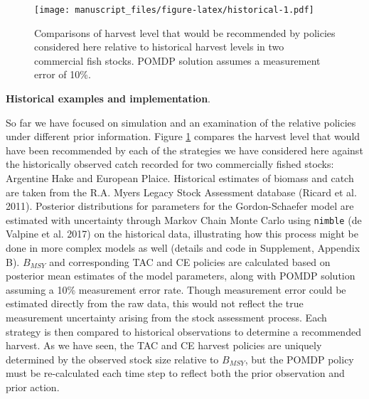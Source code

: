 \documentclass[3p]{elsarticle} %
\makeatletter
\def\maxwidth{\ifdim\Gin@nat@width>\linewidth\linewidth
\else\Gin@nat@width\fi}
\let\Oldincludegraphics\includegraphics
\renewcommand{\includegraphics}[1]{\Oldincludegraphics[width=\maxwidth]{#1}}
\makeatother
\begin{document}
\begin{figure}
\centering
\texttt{[image: manuscript\_files/figure-latex/historical-1.pdf]}
\caption{Comparisons of harvest level that would be recommended by
policies considered here relative to historical harvest levels in two
commercial fish stocks. POMDP solution assumes a measurement error of
10\%. \label{historical}}
\end{figure}

\textbf{Historical examples and implementation}.

So far we have focused on simulation and an examination of the relative
policies under different prior information. Figure \ref{historical}
compares the harvest level that would have been recommended by each of
the strategies we have considered here against the historically observed
catch recorded for two commercially fished stocks: Argentine Hake and
European Plaice. Historical estimates of biomass and catch are taken
from the R.A. Myers Legacy Stock Assessment database (Ricard et al.
2011). Posterior distributions for parameters for the Gordon-Schaefer
model are estimated with uncertainty through Markov Chain Monte Carlo
using \texttt{nimble} (de Valpine et al. 2017) on the historical data,
illustrating how this process might be done in more complex models as
well (details and code in Supplement, Appendix B). \(B_{MSY}\) and
corresponding TAC and CE policies are calculated based on posterior mean
estimates of the model parameters, along with POMDP solution assuming a
10\% measurement error rate. Though measurement error could be estimated
directly from the raw data, this would not reflect the true measurement
uncertainty arising from the stock assessment process. Each strategy is
then compared to historical observations to determine a recommended
harvest. As we have seen, the TAC and CE harvest policies are uniquely
determined by the observed stock size relative to \(B_{MSY}\), but the
POMDP policy must be re-calculated each time step to reflect both the
prior observation and prior action.
\end{document}
